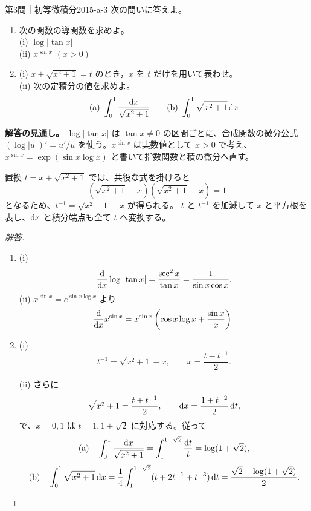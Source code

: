 \begin{problem}{第3問｜初等微積分}{2015-a-3}
次の問いに答えよ。
\begin{enumerate}
  \item[(1)] 次の関数の導関数を求めよ。\\
  (i) $\log|\tan x|$\\
  (ii) $x^{\sin x}$ $(x>0)$
  \item[(2)] (i) $x+\sqrt{x^2+1}=t$ のとき，$x$ を $t$ だけを用いて表わせ。\\
  (ii) 次の定積分の値を求めよ。
  \[
  \text{(a)}\ \int_0^1\frac{\d x}{\sqrt{x^2+1}}
  \qquad
  \text{(b)}\ \int_0^1\sqrt{x^2+1}\,\d x
  \]
\end{enumerate}
\end{problem}
\begin{memo*}
\textbf{解答の見通し。}
$\log|\tan x|$ は $\tan x\ne0$ の区間ごとに、合成関数の微分公式
$(\log|u|)'=u'/u$ を使う。$x^{\sin x}$ は実数値として $x>0$ で考え、
$x^{\sin x}=\exp(\sin x\log x)$ と書いて指数関数と積の微分へ直す。

置換 $t=x+\sqrt{x^2+1}$ では、共役な式を掛けると
\[
(\sqrt{x^2+1}+x)(\sqrt{x^2+1}-x)=1
\]
となるため、$t^{-1}=\sqrt{x^2+1}-x$ が得られる。
$t$ と $t^{-1}$ を加減して $x$ と平方根を表し、$\mathrm{d} x$ と積分端点も全て $t$ へ変換する。
\end{memo*}
\begin{proof}[解答]
\begin{enumerate}
  \item[(1)] (i)
  \[
  \frac{\mathrm{d}}{\mathrm{d} x}\log|\tan x|
  =\frac{\sec^2x}{\tan x}
  =\frac1{\sin x\cos x}.
  \]
  (ii) $x^{\sin x}=e^{\sin x\log x}$ より
  \[
  \frac{\mathrm{d}}{\mathrm{d} x}x^{\sin x}
  =x^{\sin x}\left(\cos x\log x+\frac{\sin x}{x}\right).
  \]

  \item[(2)] (i)
  \[
  t^{-1}=\sqrt{x^2+1}-x,\qquad
  x=\frac{t-t^{-1}}2.
  \]

  (ii) さらに
  \[
  \sqrt{x^2+1}=\frac{t+t^{-1}}2,\qquad
  \mathrm{d} x=\frac{1+t^{-2}}2\,\mathrm{d} t,
  \]
  で、$x=0,1$ は $t=1,1+\sqrt2$ に対応する。従って
  \[
  \text{(a)}\quad
  \int_0^1\frac{\mathrm{d} x}{\sqrt{x^2+1}}
  =\int_1^{1+\sqrt2}\frac{\mathrm{d} t}{t}
  =\log(1+\sqrt2),
  \]
  \[
  \text{(b)}\quad
  \int_0^1\sqrt{x^2+1}\,\mathrm{d} x
  =\frac14\int_1^{1+\sqrt2}(t+2t^{-1}+t^{-3})\,\mathrm{d} t
  =\frac{\sqrt2+\log(1+\sqrt2)}2.
  \]
\end{enumerate}
\end{proof}

